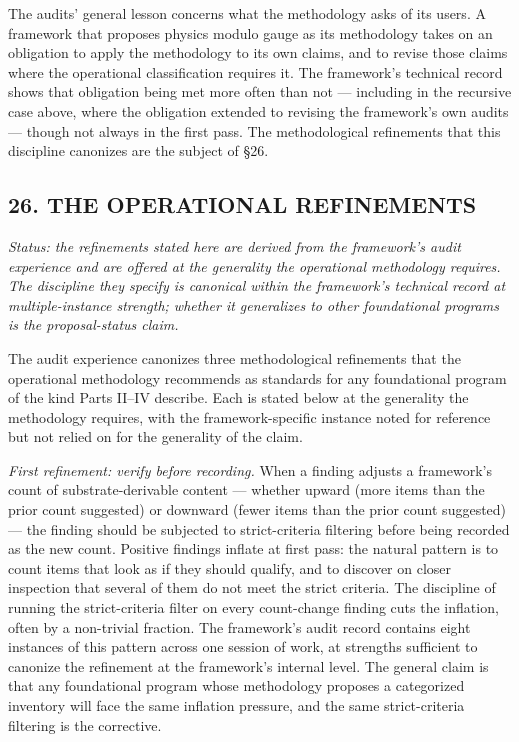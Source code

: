 \documentclass[
]{article}
\begin{document}
The audits' general lesson concerns what the methodology asks of its
users. A framework that proposes physics modulo gauge as its methodology
takes on an obligation to apply the methodology to its own claims, and
to revise those claims where the operational classification requires it.
The framework's technical record shows that obligation being met more
often than not --- including in the recursive case above, where the
obligation extended to revising the framework's own audits --- though
not always in the first pass. The methodological refinements that this
discipline canonizes are the subject of §26.

\hypertarget{the-operational-refinements}{%
\subsection{26. THE OPERATIONAL
REFINEMENTS}\label{the-operational-refinements}}

\emph{Status: the refinements stated here are derived from the
framework's audit experience and are offered at the generality the
operational methodology requires. The discipline they specify is
canonical within the framework's technical record at multiple-instance
strength; whether it generalizes to other foundational programs is the
proposal-status claim.}

The audit experience canonizes three methodological refinements that the
operational methodology recommends as standards for any foundational
program of the kind Parts II--IV describe. Each is stated below at the
generality the methodology requires, with the framework-specific
instance noted for reference but not relied on for the generality of the
claim.

\emph{First refinement: verify before recording.} When a finding adjusts
a framework's count of substrate-derivable content --- whether upward
(more items than the prior count suggested) or downward (fewer items
than the prior count suggested) --- the finding should be subjected to
strict-criteria filtering before being recorded as the new count.
Positive findings inflate at first pass: the natural pattern is to count
items that look as if they should qualify, and to discover on closer
inspection that several of them do not meet the strict criteria. The
discipline of running the strict-criteria filter on every count-change
finding cuts the inflation, often by a non-trivial fraction. The
framework's audit record contains eight instances of this pattern across
one session of work, at strengths sufficient to canonize the refinement
at the framework's internal level. The general claim is that any
foundational program whose methodology proposes a categorized inventory
will face the same inflation pressure, and the same strict-criteria
filtering is the corrective.
\end{document}
